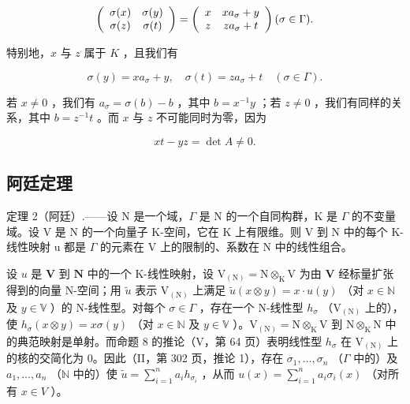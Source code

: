\[
\left( \begin{array}{c c} \sigma (x) & \sigma (y) \\ \sigma (z) & \sigma (t) \end{array} \right) = \left( \begin{array}{c c} x & x a _ {\sigma} + y \\ z & z a _ {\sigma} + t \end{array} \right) (\sigma \in \Gamma).
\]

特别地，\(x\) 与 \(z\) 属于 \(K\) ，且我们有

\[
\sigma (y) = x a _ {\sigma} + y, \quad \sigma (t) = z a _ {\sigma} + t \quad (\sigma \in \Gamma).
\]

若 \(x \neq 0\) ，我们有 \(a_{\sigma} = \sigma(b) - b\) ，其中 \(b = x^{-1}y\) ；若 \(z \neq 0\) ，我们有同样的关系，其中 \(b = z^{-1}t\) 。而 \(x\) 与 \(z\) 不可能同时为零，因为

\[
x t - y z = \det A \neq 0.
\]

\subsection{阿廷定理}

定理 2（阿廷）.——设 N 是一个域，\(\Gamma\) 是 N 的一个自同构群，K 是 \(\Gamma\) 的不变量域。设 V 是 N 的一个向量子 K-空间，它在 K 上有限维。则 V 到 N 中的每个 K-线性映射 u 都是 \(\Gamma\) 的元素在 V 上的限制的、系数在 N 中的线性组合。

设 \(u\) 是 \(\mathbf{V}\) 到 \(\mathbf{N}\) 中的一个 K-线性映射，设 \(\mathrm{V}_{(\mathrm{N})} = \mathrm{N} \otimes_{\mathrm{K}} \mathrm{V}\) 为由 \(\mathbf{V}\) 经标量扩张得到的向量 N-空间；用 \(\tilde{u}\) 表示 \(\mathrm{V}_{(\mathrm{N})}\) 上满足 \(\tilde{u}(x \otimes y) = x \cdot u(y)\) （对 \(x \in \mathbb{N}\) 及 \(y \in \mathbb{V}\) ）的 N-线性型。对每个 \(\sigma \in \Gamma\) ，存在一个 N-线性型 \(h_{\sigma}\) （\(\mathrm{V}_{(\mathrm{N})}\) 上的），使 \(h_{\sigma}(x \otimes y) = x \sigma(y)\) （对 \(x \in \mathbb{N}\) 及 \(y \in \mathbb{V}\) ）。\(\mathrm{V}_{(\mathrm{N})} = \mathrm{N} \otimes_{\mathrm{K}} \mathrm{V}\) 到 \(\mathrm{N} \otimes_{\mathrm{K}} \mathrm{N}\) 中的典范映射是单射。而命题 8 的推论（V，第 64 页）表明线性型 \(h_{\sigma}\) 在 \(\mathrm{V}_{(\mathrm{N})}\) 上的核的交简化为 0。因此（II，第 302 页，推论 1），存在 \(\sigma_1, \ldots, \sigma_n\) （\(\Gamma\) 中的）及 \(a_1, \ldots, a_n\) （\(\mathbb{N}\) 中的）使 \(\tilde{u} = \sum_{i=1}^{n} a_i h_{\sigma_i}\) ，从而 \(u(x) = \sum_{i=1}^{n} a_i \sigma_i(x)\) （对所有 \(x \in V\) ）。

